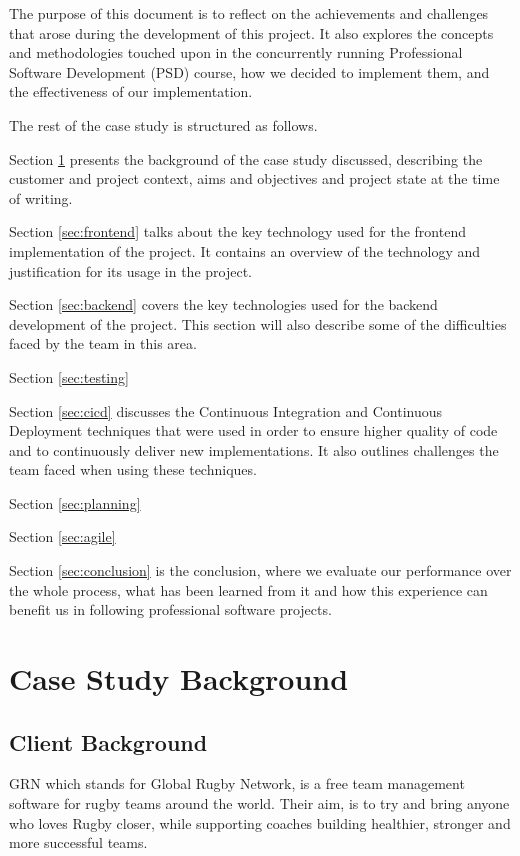 \documentclass{l3proj}
\begin{document}
The purpose of this document is to reflect on the achievements and challenges
 that arose during the development of this project. It also explores the concepts
 and methodologies touched upon in the concurrently running Professional Software
 Development (PSD) course, how we decided to implement them, and the effectiveness
 of our implementation.

The rest of the case study is structured as follows.

Section \ref{sec:background} presents the background of the case study
 discussed, describing the customer and project context, aims and
 objectives and project state at the time of writing.

Section \ref{sec:frontend} talks about the key technology used for the
 frontend implementation of the project. It contains an overview of the
 technology and justification for its usage in the project.

Section \ref{sec:backend} covers the key technologies used for the
 backend development of the project. This section will also describe
 some of the difficulties faced by the team in this area.

Section \ref{sec:testing} %

Section \ref{sec:cicd} discusses the Continuous Integration and Continuous
 Deployment techniques that were used in order to ensure higher quality
 of code and to continuously deliver new implementations. It also outlines
 challenges the team faced when using these techniques.

Section \ref{sec:planning} %

Section \ref{sec:agile} %

Section \ref{sec:conclusion} is the conclusion, where we evaluate our
 performance over the whole process, what has been learned from it and
 how this experience can benefit us in following professional software projects.


\section{Case Study Background}
\label{sec:background}

\subsection{Client Background}

GRN which stands for Global Rugby Network, is a free team management software
for rugby teams around the world. Their aim, is to try and bring anyone who loves
Rugby closer, while supporting coaches building healthier, stronger and more
successful teams.
\end{document}
